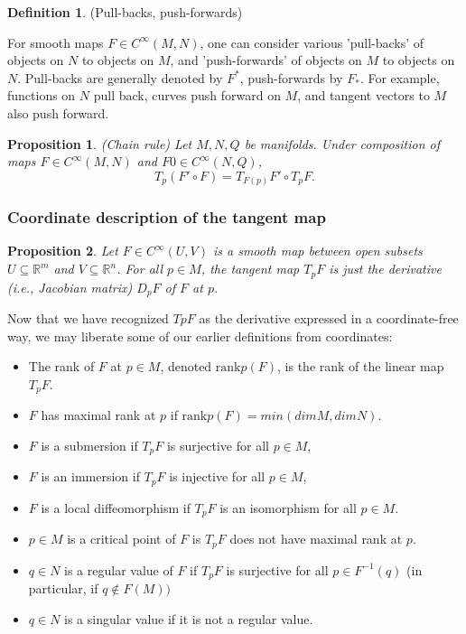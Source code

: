 \documentclass{article}
\newtheorem{proposition}{Proposition}[theorem]
\theoremstyle{definition}
\newtheorem{defn}[theorem]{Definition}
\newenvironment{definition}
  {\vspace{8pt}\begin{mdframed}[backgroundcolor=blueish]\begin{defn}}
  {\end{defn}\end{mdframed}\vspace{4pt}}
\begin{document}
\begin{definition}(Pull-backs, push-forwards)

For smooth maps $F \in C^\infty(M,N)$, one can consider various 'pull-backs' of objects on $N$ to objects on $M$, and 'push-forwards' of objects on $M$ to objects on $N$. Pull-backs are generally denoted by $F^{*}$, push-forwards by $F_{*}$. For example, functions on $N$ pull back, curves push forward on $M$, and tangent vectors to $M$ also push forward.
\end{definition}


\begin{proposition} (Chain rule)
Let $M,N,Q$ be manifolds. Under composition of maps $F \in C^\infty(M,N)$ and $F0 \in C^\infty(N,Q)$,
\[
    T_p(F'\circ F) = T_{F(p)} F' \circ T_pF. 
\]

\end{proposition}

\subsubsection{Coordinate description of the tangent map}
\begin{proposition}

Let $F \in C^\infty(U,V)$ is a smooth map between open subsets $U \subseteq \mathbb R^m $ and $V \subseteq \mathbb R^n$. For all $p \in M$, the tangent map $T_pF$ is just the derivative (i.e., Jacobian matrix) $D_pF$ of $F$ at $p$.
\end{proposition}

Now that we have recognized $TpF$ as the derivative expressed in a coordinate-free way, we may liberate some of our earlier definitions from coordinates:
\begin{itemize}
    \item  The rank of $F$ at $p \in M$, denoted $\text{rank}p(F)$, is the rank of the linear map $T_pF$.
    \item $F$ has maximal rank at $p$ if $\text{rank}p(F) = min(dim M, dim N)$.
    \item $F$ is a submersion if $T_pF$ is surjective for all $p \in M$,
    \item $F$ is an immersion if $T_pF$ is injective for all $p \in M$,
    \item $F$ is a local diffeomorphism if $T_pF$ is an isomorphism for all $p \in M$.
    \item $p \in M$ is a critical point of $F$ is $T_pF$ does not have maximal rank at $p$.
    \item $q \in N$ is a regular value of $F$ if $T_pF$ is surjective for all $p \in F^{-1} (q)$ (in particular, if $q \not\in F(M))$
    \item $q \in N$ is a singular value if it is not a regular value.
\end{itemize}
\end{document}
